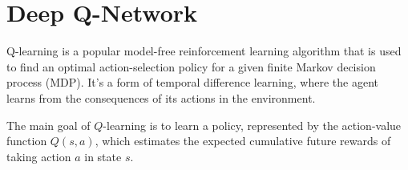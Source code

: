 \chapter{Deep Q-Network}
Q-learning is a popular model-free reinforcement learning algorithm that is used to find an optimal action-selection policy for a given finite Markov decision process (MDP). It's a form of temporal difference learning, where the agent learns from the consequences of its actions in the environment.

The main goal of $Q$-learning is to learn a policy, represented by the action-value function $Q(s,a)$, which estimates the expected cumulative future rewards of taking action $a$ in state $s$.
